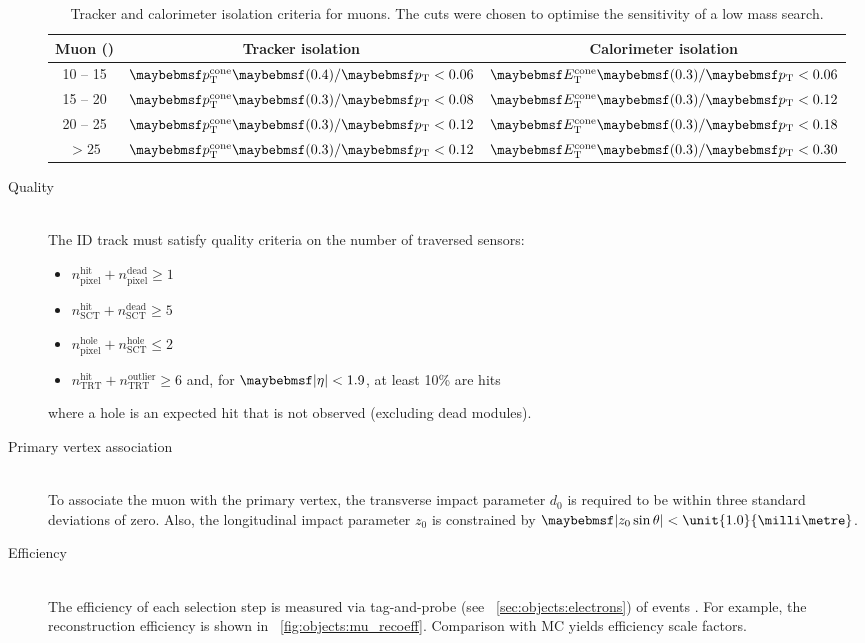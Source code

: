 \begin{description}
	\clearpage
	\begin{table}[t]
		\begin{tabular}{c@{\hskip 0.3in}c@{\hskip 0.3in}c}
			\toprule
			Muon \pt (\GeV) & Tracker isolation & Calorimeter isolation \\
			\midrule
			10 -- 15 & $\ptcone{0.4}/\pt < 0.06$ & $\etcone{0.3}/\pt < 0.06$ \\
			15 -- 20 & $\ptcone{0.3}/\pt < 0.08$ & $\etcone{0.3}/\pt < 0.12$ \\
			20 -- 25 & $\ptcone{0.3}/\pt < 0.12$ & $\etcone{0.3}/\pt < 0.18$ \\
			$> 25$   & $\ptcone{0.3}/\pt < 0.12$ & $\etcone{0.3}/\pt < 0.30$ \\
			\bottomrule
		\end{tabular}
		\caption{Tracker and calorimeter isolation criteria for muons. The cuts were 
		chosen to optimise the sensitivity of a low mass \HWWlvlv search.}
		\label{tab:objects:mu_iso}
	\end{table}

\item[Quality] \hfill \\
	The ID track must satisfy quality criteria on the number of traversed sensors:
	\begin{itemize}[noitemsep,nolistsep]
		\item $n_{\text{pixel}}^{\text{hit}} + n_{\text{pixel}}^{\text{dead}} \geq 1$
		\item $n_{\text{SCT}}^{\text{hit}} + n_{\text{SCT}}^{\text{dead}} \geq 5$
		\item $n_{\text{pixel}}^{\text{hole}} + n_{\text{SCT}}^{\text{hole}} \leq 2$
		\item $n_{\text{TRT}}^{\text{hit}} + n_{\text{TRT}}^{\text{outlier}} \geq 6$ and, 
		for $\mods{\eta} < 1.9$, at least 10\% are hits
	\end{itemize}
	where a hole is an expected hit that is not observed (excluding dead modules).

\item[Primary vertex association] \hfill \\
	To associate the muon with the primary vertex, the transverse impact parameter $d_0$ 
	is required to be within three standard deviations of zero. Also, the longitudinal 
	impact parameter $z_0$ is constrained by $\mods{z_0 \sin\theta} < 
	\unit{1.0}{\milli\metre}$.

\item[Efficiency] \hfill \\
	The efficiency of each selection step is measured via tag-and-probe (see 
	\Section~\ref{sec:objects:electrons}) of 
	\HepProcess{\PZ \HepTo \Pmu\Pmu} events \cite{Muons:2012}. For example, the 
	reconstruction efficiency is shown in \Figure~\ref{fig:objects:mu_recoeff}. 
	Comparison with MC yields efficiency scale factors.


\end{description}
